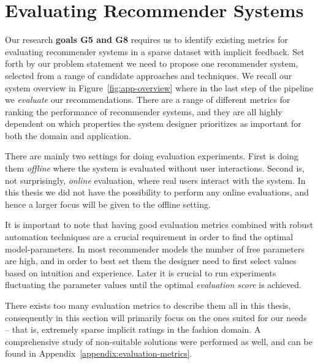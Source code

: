 \section{Evaluating Recommender Systems}
\label{sec:evaluation}

Our research \textbf{goals G5 and G8} requires us to identify existing metrics
for evaluating recommender systems in a sparse dataset with implicit feedback.
Set forth by our problem statement we need to propose one recommender system,
selected from a range of candidate approaches and techniques. We recall our
system overview in Figure~\ref{fig:app-overview} where in the last step of
the pipeline we \textit{evaluate} our recommendations. There are a range of
different metrics for ranking the performance of recommender systems, and they
are all highly dependent on which properties the system designer prioritizes as
important for both the domain and application.

There are mainly two settings for doing evaluation experiments. First is doing
them \textit{offline} where the system is evaluated without user interactions.
Second is, not surprisingly, \textit{online} evaluation, where real users
interact with the system. In this thesis we did not have the possibility to
perform any online evaluations, and hence a larger focus will be given to the
offline setting.

It is important to note that having good evaluation metrics combined with
robust automation techniques are a crucial requirement in order to find the
optimal model-parameters. In most recommender models the number of free
parameters are high, and in order to best set them the designer need to first
select values based on intuition and experience. Later it is crucial to run
experiments fluctuating the parameter values until the optimal
\textit{evaluation score} is achieved.

There exists too many evaluation metrics to describe them all in this thesis,
consequently in this section will primarily focus on the ones suited for our
needs -- that is, extremely sparse implicit ratings in the fashion domain. A
comprehensive study of non-suitable solutions were performed as well, and can
be found in Appendix~\ref{appendix:evaluation-metrics}.

